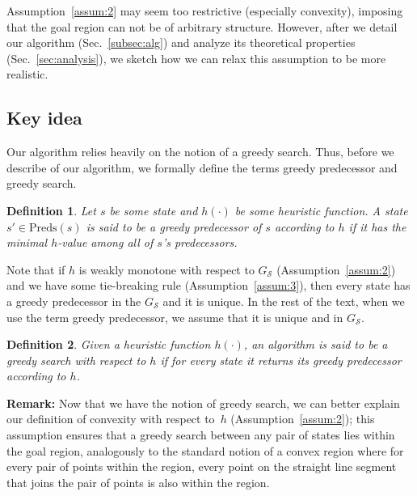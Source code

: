 \documentclass[letterpaper]{article} %
\newcommand{\calS}{\ensuremath{\mathcal{S}}\xspace}
\newtheorem{definition}{Definition}
\begin{document}
Assumption~\ref{assum:2} may seem too restrictive (especially convexity), imposing that the goal region can not be of arbitrary structure. However, after we detail our algorithm (Sec.~\ref{subsec:alg}) and analyze its theoretical properties (Sec.~\ref{sec:analysis}), we sketch how we can relax this assumption to be more realistic.


 
\subsection{Key idea}
\label{sec:key}
Our algorithm relies heavily on the notion of a greedy search.  Thus, before we describe of our algorithm, we formally define the terms greedy predecessor and greedy search.

\vspace{2mm}
\begin{definition}
\label{def:greedy-suc}
	Let $s$ be some state and $h(\cdot)$ be some heuristic function.
	A state $s' \in \text{Preds}(s)$ is said to be a \emph{greedy} predecessor of $s$ according to $h$ if it has the minimal $h$-value among all of $s$'s predecessors.
\end{definition}
Note that 
if $h$ is weakly monotone with respect to $G_\calS$
(Assumption~\ref{assum:2}) 
and we have some tie-breaking rule
(Assumption~\ref{assum:3}), then every state has a greedy predecessor in the $G_\calS$ and it is unique.
In the rest of the text, when we use the term greedy predecessor, we assume that it is unique and in $G_\calS$.

\vspace{2mm}
\begin{definition}
	Given a heuristic function $h(\cdot)$,
	an algorithm is said to be a \emph{greedy search}	 with respect to $h$ if for every state it returns its greedy predecessor according to $h$.
\end{definition}

\textbf{Remark:} Now that we have the notion of greedy search, we can better explain our definition of convexity with respect to~$h$ (Assumption~\ref{assum:2});
this assumption ensures that a greedy search between any pair of states lies within the goal region, analogously to the standard notion of a convex   region where for every pair of points within the region, every point on the straight line segment that joins the pair of points is also within the region.
\end{document}
